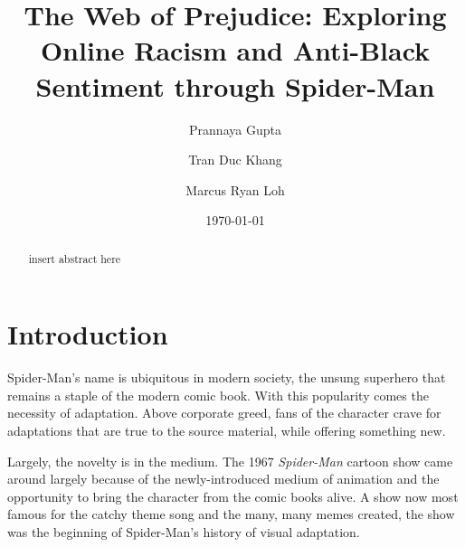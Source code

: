 \documentclass[%
 reprint,
 amsmath,amssymb,
 aps,
]{revtex4-2}
\begin{document}

\title{The Web of Prejudice: Exploring Online Racism and Anti-Black Sentiment through Spider-Man}%

\author{Prannaya Gupta}%
\author{Tran Duc Khang}%
\author{Marcus Ryan Loh}%
 
%




\date{\today}%

\begin{abstract}
insert abstract here
\end{abstract}

\maketitle


\section{\label{sec:introduction}Introduction}

Spider-Man's name is ubiquitous in modern society, the unsung superhero that remains a staple of the modern comic book. With this popularity comes the necessity of adaptation. Above corporate greed, fans of the character crave for adaptations that are true to the source material, while offering something new. 

Largely, the novelty is in the medium. The 1967 \textit{Spider-Man} cartoon show came around largely because of the newly-introduced medium of animation and the opportunity to bring the character from the comic books alive. A show now most famous for the catchy theme song and the many, many memes created, the show was the beginning of Spider-Man's history of visual adaptation.
\end{document}
